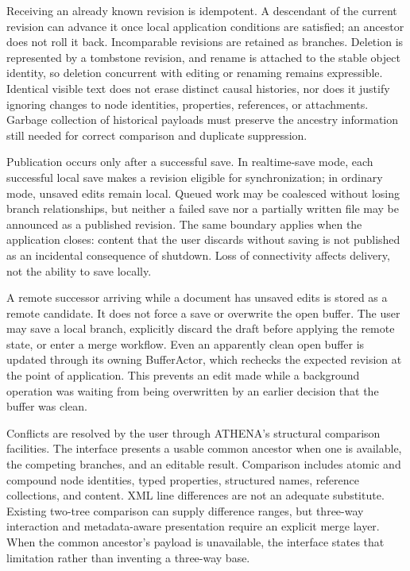 \documentclass[11pt,a4paper]{article}
\theoremstyle{definition}
\theoremstyle{plain}
\begin{document}
Receiving an already known revision is idempotent. A descendant of the
current revision can advance it once local application conditions are
satisfied; an ancestor does not roll it back. Incomparable revisions
are retained as branches. Deletion is represented by a tombstone
revision, and rename is attached to the stable object identity, so
deletion concurrent with editing or renaming remains expressible.
Identical visible text does not erase distinct causal histories, nor
does it justify ignoring changes to node identities, properties,
references, or attachments. Garbage collection of historical payloads
must preserve the ancestry information still needed for correct
comparison and duplicate suppression.

Publication occurs only after a successful save. In realtime-save mode,
each successful local save makes a revision eligible for synchronization;
in ordinary mode, unsaved edits remain local. Queued work may be coalesced
without losing branch relationships, but neither a failed save nor a
partially written file may be announced as a published revision. The
same boundary applies when the application closes: content that the
user discards without saving is not published as an incidental consequence
of shutdown. Loss of connectivity affects delivery, not the ability to
save locally.

A remote successor arriving while a document has unsaved edits is
stored as a remote candidate. It does not force a save or overwrite the
open buffer. The user may save a local branch, explicitly discard the
draft before applying the remote state, or enter a merge workflow.
Even an apparently clean open buffer is updated through its owning
BufferActor, which rechecks the expected revision at the point of
application. This prevents an edit made while a background operation
was waiting from being overwritten by an earlier decision that the
buffer was clean.

Conflicts are resolved by the user through ATHENA's structural comparison
facilities. The interface presents a usable common ancestor when one
is available, the competing branches, and an editable result. Comparison
includes atomic and compound node identities, typed properties,
structured names, reference collections, and content. XML line differences
are not an adequate substitute. Existing two-tree comparison can supply
difference ranges, but three-way interaction and metadata-aware
presentation require an explicit merge layer. When the common ancestor's
payload is unavailable, the interface states that limitation rather
than inventing a three-way base.
\end{document}
